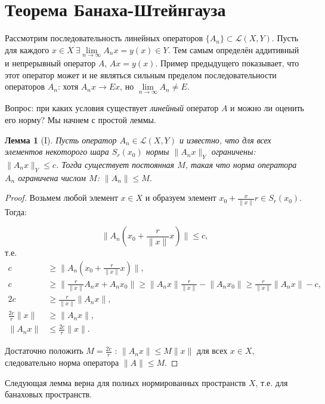 \documentclass[12pt,a4paper,titlepage,oneside]{book}
\theoremstyle{definition}
\theoremstyle{plain}
\theoremstyle{break}
\theoremstyle{remark}
\theoremstyle{remark}
\theoremstyle{remark}
\theoremstyle{remark}
\theoremstyle{plain}
\newtheorem*{lemma}{Лемма}
\theoremstyle{plain}
\begin{document}
\section{Теорема Банаха-Штейнгауза}
Рассмотрим последовательность линейных операторов $\lbrace A_n \rbrace \subset \mathcal{L}(X,Y)$. Пусть для каждого $x \in X\ \exists \lim\limits_{n\to \infty}A_n x = y(x) \in Y$. Тем самым определён аддитивный и непрерывный оператор $A$, $Ax = y(x)$. Пример предыдущего  показывает, что этот оператор может и не являться сильным пределом последовательности операторов $A_n$: хотя $A_n x \to E x$, но $\lim \limits_{n \to \infty} A_n \ne E$.

Вопрос: при каких условия существует \textit{линейный} оператор $A$ и можно ли оценить его норму? Мы начнем с простой леммы.

\begin{lemma}[I]
Пусть оператор $A_n \in \mathcal{L}(X,Y)$ и известно, что для всех элементов некоторого шара $S_r(x_0)$ нормы $\lVert A_n x\rVert_Y$ ограничены: $\lVert A_n x\rVert_Y \leqslant c$. Тогда существует постоянная $M$, такая что норма оператора $A_n$ ограничена числом $M$: $\lVert A_n \rVert \leqslant M$.
\end{lemma}

\begin{proof}
Возьмем любой элемент $x \in X$ и образуем элемент $x_0+\frac{x}{\lVert x\rVert}r \in S_r(x_0)$. Тогда:

$$\lVert A_n(x_0+\frac{r}{\lVert x \rVert}x) \rVert \leqslant c,$$
т.е.
\begin{align*}
c &\geqslant \lVert A_n(x_0+\frac{r}{\lVert x \rVert}x) \rVert,\\
c &\geqslant \lVert \frac{r}{\lVert x \rVert}A_n x + A_n x_0 \rVert \geqslant \lVert A_n x \rVert \frac{r}{\lVert x\rVert} - \lVert A_n x_0 \rVert \geqslant \frac{r}{\lVert x \rVert}\lVert A_n x \rVert - c,\\
2c &\geqslant \frac{r}{\lVert x \rVert}\lVert A_n x\rVert,\\
\frac{2c}{r}\lVert x \rVert &\geqslant \lVert A_n x\rVert,\\
\lVert A_n x \rVert &\leqslant \frac{2c}{r}\lVert x \rVert.
\end{align*}

Достаточно положить $M=\frac{2c}{r}$ : $\lVert A_n x\rVert \leqslant M\lVert x\rVert$ для всех $x \in X$, следовательно норма оператора $\lVert A\rVert \leqslant M$.
\end{proof}

Следующая лемма верна для полных нормированных пространств $X$, т.е. для банаховых пространств.
\end{document}
